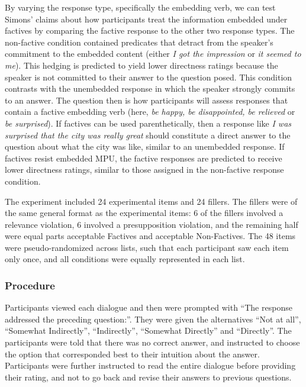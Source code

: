 \documentclass[output=paper]{LSP/langsci}
\begin{document}
By varying the response type, specifically the embedding verb, we can test
Simons' claims about how participants treat the information embedded under
factives by comparing the factive response to the other two response types.
The non-factive condition contained predicates that detract from the speaker's
commitment to the embedded content (either \textit{I got the impression} or
\textit{it seemed to me}).  This hedging is predicted to yield lower
directness ratings because the speaker is not committed to their answer to the
question posed.  This condition contrasts with the unembedded response in which
the speaker strongly commits to an answer.  The question then is how
participants will assess responses that contain a factive embedding verb (here,
\textit{be happy, be disappointed, be relieved} or \textit{be surprised}).  If
factives can be used parenthetically, then a response like {\it I was surprised
that the city was really great} should constitute a direct answer to the
question about what the city was like, similar to an unembedded response.  If
factives resist embedded MPU, the factive responses are predicted to receive
lower directness ratings, similar to those assigned in the non-factive response condition. 

The experiment included 24 experimental items and 24 fillers. The fillers were of the same general format as the experimental items: 6 of the fillers involved a relevance violation, 6 involved a presupposition violation, and the remaining half were equal parts acceptable Factives and acceptable Non-Factives. The 48 items were pseudo-randomized across lists, such that each participant saw each item only once, and all conditions were equally represented in each list. 


\subsubsection*{Procedure}

Participants viewed each dialogue and then were prompted with ``The response addressed the preceding question:''. They were given the alternatives ``Not at all'', ``Somewhat Indirectly'', ``Indirectly'', ``Somewhat Directly'' and ``Directly''. The participants were told that there was no correct answer, and instructed to choose the option that corresponded best to their intuition about the answer. Participants were further instructed to read the entire dialogue before providing their rating, and not to go back and revise their answers to previous questions.
\end{document}

